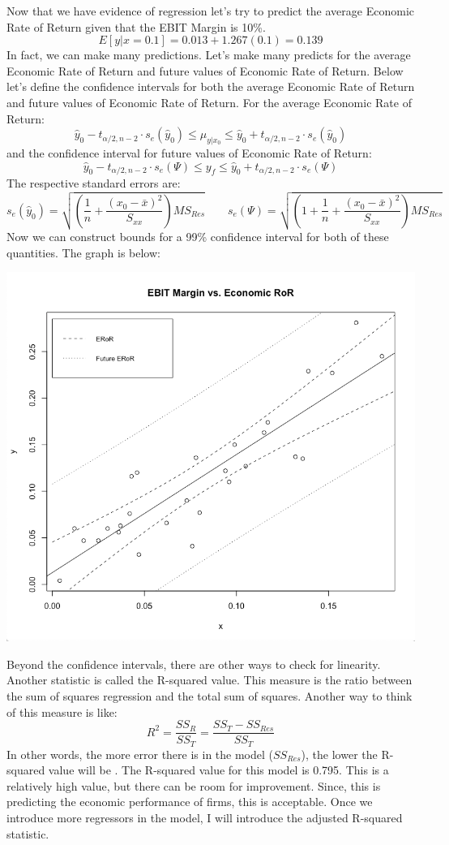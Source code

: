 \documentclass[12pt,letterpaper]{article}
\begin{document}
Now that we have evidence of regression let's try to predict the average Economic Rate of Return given that the EBIT Margin is 10\%. $$E[y|x=0.1]=0.013+1.267(0.1)=0.139$$ In fact, we can make many predictions. Let's make many predicts for the average Economic Rate of Return and future values of Economic Rate of Return. Below let's define the confidence intervals for both the average Economic Rate of Return and future values of Economic Rate of Return. For the average Economic Rate of Return: $$\hat{y}_0-t_{\alpha/2,n-2}\cdot s_e\left(\hat{y}_0\right)\leq \mu_{y|x_0}\leq \hat{y}_0+t_{\alpha/2,n-2}\cdot s_e\left(\hat{y}_0\right)$$ and the confidence interval for future values of Economic Rate of Return: $$\hat{y}_0-t_{\alpha/2,n-2}\cdot s_e\left(\Psi\right)\leq y_f\leq \hat{y}_0+t_{\alpha/2,n-2}\cdot s_e\left(\Psi\right)$$ The respective standard errors are: $$s_e\left(\hat{y}_0\right)=\sqrt{\left(\frac{1}{n}+\frac{\left(x_0-\bar{x}\right)^2}{S_{xx}}\right)MS_{Res}}\qquad s_e\left(\Psi\right)=\sqrt{\left(1+\frac{1}{n}+\frac{\left(x_0-\bar{x}\right)^2}{S_{xx}}\right)MS_{Res}}$$ Now we can construct bounds for a 99\% confidence interval for both of these quantities. The graph is below:

\begin{center}
\includegraphics[scale=0.4]{99CI.png}
\end{center}

Beyond the confidence intervals, there are other ways to check for linearity. Another statistic is called the R-squared value. This measure is the ratio between the sum of squares regression and the total sum of squares. Another way to think of this measure is like: $$R^2=\frac{SS_R}{SS_T}=\frac{SS_T-SS_{Res}}{SS_T}$$ In other words, the more error there is in the model ($SS_{Res}$), the lower the R-squared value will be \cite{text2}. The R-squared value for this model is 0.795. This is a relatively high value, but there can be room for improvement. Since, this is predicting the economic performance of firms, this is acceptable. Once we introduce more regressors in the model, I will introduce the adjusted R-squared statistic.
\end{document}
